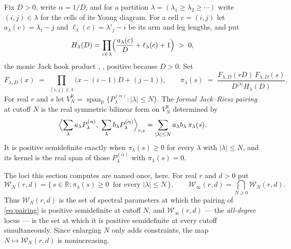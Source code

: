 \documentclass[11pt,letterpaper]{article}
\newcommand{\Rr}{\mathbb{R}}
\begin{document}
\begin{definition}
\label{def:jack}
Fix $D>0$, write $\alpha=1/D$, and for a partition
$\lambda=(\lambda_1\ge\lambda_2\ge\cdots)$ write $(i,j)\in\lambda$ for the cells of
its Young diagram. For a cell $c=(i,j)$ let
$a_\lambda(c)=\lambda_i-j$ and $\ell_\lambda(c)=\lambda'_j-i$ be its arm and leg
lengths, and put
\begin{equation}
  H_\lambda(D)=\prod_{c\in\lambda}
  \Bigl(\frac{a_\lambda(c)}{D}+\ell_\lambda(c)+1\Bigr)\;>\;0 ,
  \label{eq:hook}
\end{equation}
the monic Jack hook product \cite[Ch.~VI, \S10]{Macdonald}, \cite{Stanley},
positive because $D>0$. Set
\begin{equation}
  F_{\lambda,D}(x)\;=\;\prod_{(i,j)\in\lambda}\bigl(x-(i-1)D+(j-1)\bigr),
  \qquad
  \pi_\lambda(s)\;=\;\frac{F_{\lambda,D}(rD)\,F_{\lambda,D}(s)}
       {D^{|\lambda|}H_\lambda(D)} .
  \label{eq:pivot}
\end{equation}
For real $r$ and $s$ let
$V_N^{\Rr}=\operatorname{span}_{\Rr}\{P^{(\alpha)}_\lambda:|\lambda|\le N\}$. The
\emph{formal Jack--Riesz pairing} at cutoff $N$ is the real symmetric bilinear
form on $V_N^{\Rr}$ determined by
\begin{equation}
  \Bigl\langle \sum_\lambda a_\lambda P^{(\alpha)}_\lambda,\;
               \sum_\lambda b_\lambda P^{(\alpha)}_\lambda\Bigr\rangle_{r,s}
  =\sum_{|\lambda|\le N} a_\lambda b_\lambda\,\pi_\lambda(s).
  \label{eq:pairing}
\end{equation}
It is positive semidefinite exactly when $\pi_\lambda(s)\ge0$ for every
$\lambda$ with $|\lambda|\le N$, and its kernel is the real span of those
$P^{(\alpha)}_\lambda$ with $\pi_\lambda(s)=0$.
\end{definition}

The loci this section computes are named once, here. For real $r$ and $d>0$ put
\begin{equation}
  \mathcal{W}_N(r,d)
  =\bigl\{\,s\in\Rr:\pi_\lambda(s)\ge0\ \text{ for every }|\lambda|\le N\,\bigr\},
  \qquad
  \mathcal{W}_\infty(r,d)=\bigcap_{N\ge0}\mathcal{W}_N(r,d).
  \label{eq:loci}
\end{equation}
Thus $\mathcal{W}_N(r,d)$ is the set of spectral parameters at which the pairing
of \eqref{eq:pairing} is positive semidefinite at cutoff $N$, and
$\mathcal{W}_\infty(r,d)$ --- the \emph{all-degree} locus --- is
the set at which it is positive semidefinite at every cutoff simultaneously.
Since enlarging $N$ only adds constraints, the map $N\mapsto\mathcal{W}_N(r,d)$
is nonincreasing.
\end{document}
